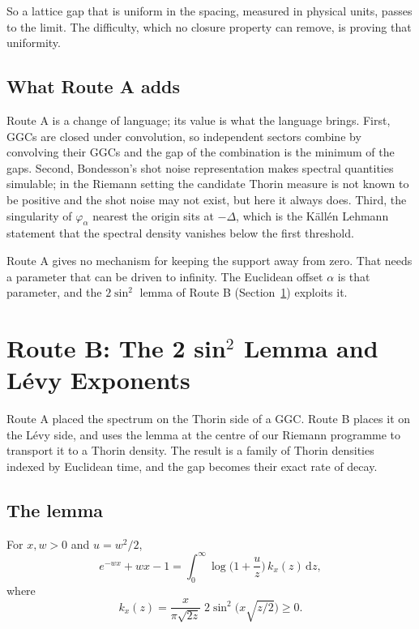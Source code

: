 So a lattice gap that is uniform in the spacing, measured in physical units, passes to the limit. The difficulty, which no closure property can remove, is proving that uniformity.

\subsection{What Route A adds}

Route A is a change of language; its value is what the language brings. First, GGCs are closed under convolution, so independent sectors combine by convolving their GGCs and the gap of the combination is the minimum of the gaps. Second, Bondesson's shot noise representation\cite{Bo92} makes spectral quantities simulable; in the Riemann setting the candidate Thorin measure is not known to be positive and the shot noise may not exist, but here it always does. Third, the singularity of $\varphi_\alpha$ nearest the origin sits at $-\Delta$, which is the K\"all\'en Lehmann statement that the spectral density vanishes below the first threshold.

Route A gives no mechanism for keeping the support away from zero. That needs a parameter that can be driven to infinity. The Euclidean offset $\alpha$ is that parameter, and the $2\sin^2$ lemma of Route B (Section~\ref{ch:routeB}) exploits it.

\section{Route B: The 2 sin\texorpdfstring{$^2$}{2} Lemma and L\'evy Exponents}\label{ch:routeB}

Route A placed the spectrum on the Thorin side of a GGC. Route B places it on the L\'evy side, and uses the lemma at the centre of our Riemann programme\cite{PS26a} to transport it to a Thorin density. The result is a family of Thorin densities indexed by Euclidean time, and the gap becomes their exact rate of decay.

\subsection{The lemma}

\begin{lemma}\label{lem:2sin2B}
For $x,w>0$ and $u=w^2/2$,
\[
e^{-wx}+wx-1=\int_0^\infty\log\Big(1+\frac uz\Big)\,k_x(z)\,\mathrm dz,
\]
where
\[
k_x(z)=\frac{x}{\pi\sqrt{2z}}\;2\sin^2\!\big(x\sqrt{z/2}\big)\ge0 .
\]
\end{lemma}

